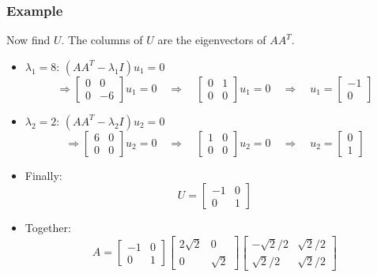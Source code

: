\documentclass[10pt]{beamer}
\begin{document}
\begin{frame}
\frametitle{Example}
Now find $U$.  The columns of $U$ are the eigenvectors of $A A^T$.
\begin{itemize}
    \item $\lambda_1=8$:  $(A A^T - \lambda_1 I) u_1 = 0$
\[
\Rightarrow 
\begin{bmatrix}
 0 & 0\\
 0 & -6 
\end{bmatrix}
u_1 = 0
\quad
\Rightarrow 
\quad
\begin{bmatrix}
0 & 1\\
0 & 0
\end{bmatrix}
u_1 = 0
\quad
\Rightarrow 
\quad
u_1 = 
\begin{bmatrix}
-1 \\
0
\end{bmatrix}
\]
    \item $\lambda_2=2$:  $(A A^T - \lambda_2 I) u_2 = 0$
\[
\Rightarrow 
\begin{bmatrix}
 6 & 0\\
 0 & 0
\end{bmatrix}
u_2 = 0
\quad
\Rightarrow 
\quad
\begin{bmatrix}
1 & 0\\
0 & 0
\end{bmatrix}
u_2 = 0
\quad
\Rightarrow 
\quad
u_2 = 
\begin{bmatrix}
0 \\
1
\end{bmatrix}
\]
    \item Finally:
\[
U=
\begin{bmatrix}
-1 & 0\\
 0 & 1
\end{bmatrix}
\]

    \item Together:
\[
A = 
\begin{bmatrix}
-1 & 0\\
 0 & 1
\end{bmatrix}
\begin{bmatrix}
2\sqrt{2} & 0\\
        0 & \sqrt{2}
\end{bmatrix}
\begin{bmatrix}
-\sqrt{2}/2 & \sqrt{2}/2\\
 \sqrt{2}/2 & \sqrt{2}/2
\end{bmatrix}
\]
\end{itemize}
\end{frame}
\end{document}
